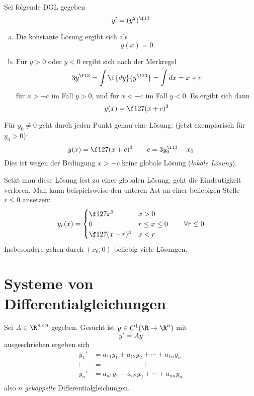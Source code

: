 \documentclass[a4paper,10pt]{scrbook}
\begin{document}
\begin{ex} \label{2.3}
	Sei folgende DGL gegeben
	\[
		y' = (y^2)^{\f 13}
	\]
	\begin{enumerate}[a)]
		\item
			Die konstante Lösung ergibt sich als
			\[
				y(x) = 0
			\]
		\item
			Für $y > 0$ oder $y < 0$ ergibt sich nach der Merkregel
			\[
				3 y^{\f 13} = \int \f {dy}{y^{\f 23}} = \int  dx = x + c 
			\]
			für $x > -c$ im Fall $y > 0$, und für $x < -c$ im Fall $y < 0$.
			Es ergibt sich dann
			\[
				y(x) = \f 1{27}(x + c)^3
			\]
	\end{enumerate}
	\begin{note}[Beobachtungen]
		Für $y_0 \neq 0$ geht durch jeden Punkt genau eine Lösung:
		(jetzt exemplarisch für $y_0 > 0$):
		\[
			y(x) = \f 1{27}(x+c)^3  
			\qquad c = 3y_0^{\f 13} - x_0
		\]
		Dies ist wegen der Bedingung $x > -c$ keine globale Lösung (\emph{lokale Lösung}).

		Setzt man diese Lösung fest zu einer globalen Lösung, geht die Eindeutigkeit verloren.
		Man kann beispielsweise den unteren Ast an einer beliebigen Stelle $r \le 0$ ansetzen:
		\[
			y_r(x) = \begin{cases}
				\f 1{27} x^3  & x > 0 \\
				0 & r \le x \le 0 \\
				\f 1{27} (x-r)^3 & x < r
			\end{cases}
			\qquad \forall r \le 0
		\]
		Insbesondere gehen durch $(x_0, 0)$ beliebig viele Lösungen.
	\end{note}
\end{ex}


\section{Systeme von Differentialgleichungen}


Sei $A \in \R^{n\times n}$ gegeben.
Gesucht ist $y \in C^1(\R \to \R^n)$ mit
\[
	y' = Ay
\]
ausgeschrieben ergeben sich
\begin{align*}
	y_1' &= a_{11} y_1 + a_{12} y_2 + \dotsb + a_{1n} y_n \\
	\vdots \; &= \qquad\qquad\qquad \vdots \\
	y_n' &= a_{n1} y_1 + a_{n2} y_2 + \dotsb + a_{nn} y_n \\
\end{align*}
also $n$ \emph{gekoppelte} Differentialgleichungen.
\end{document}
